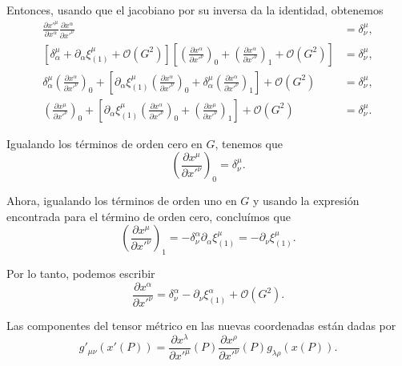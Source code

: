 \documentclass[letterpaper,11pt]{article}
\begin{document}
Entonces, usando que el jacobiano por su inversa da la identidad, obtenemos
\begin{align}
\frac{\partial x'^{\mu}}{\partial x^{\alpha}} \frac{\partial x^{\alpha}}{\partial x'^{\nu}} &= \delta^{\mu}_{\nu}, \\
\left[\delta^{\mu}_{\alpha} + \partial_{\alpha} \xi^{\mu}_{(1)} + \mathcal{O}(G^2)\right] \left[ \left(\frac{\partial x^{\alpha}}{\partial x'^{\nu}}\right)_0 + \left(\frac{\partial x^{\alpha}}{\partial x'^{\nu}}\right)_1 + \mathcal{O}(G^2) \right] &= \delta^{\mu}_{\nu}, \\
\delta^{\mu}_{\alpha} \left(\frac{\partial x^{\alpha}}{\partial x'^{\nu}}\right)_0 + \left[ \partial_{\alpha} \xi^{\mu}_{(1)}  \left(\frac{\partial x^{\alpha}}{\partial x'^{\nu}}\right)_0 + \delta_{\alpha}^{\mu}  \left(\frac{\partial x^{\alpha}}{\partial x'^{\nu}}\right)_1 \right] + \mathcal{O}(G^2)  &= \delta^{\mu}_{\nu}, \\
\left(\frac{\partial x^{\mu}}{\partial x'^{\nu}}\right)_0 + \left[  \partial_{\alpha} \xi^{\mu}_{(1)}  \left(\frac{\partial x^{\alpha}}{\partial x'^{\nu}}\right)_0 +  \left(\frac{\partial x^{\mu}}{\partial x'^{\nu}}\right)_1\right] + \mathcal{O}(G^2)  &= \delta^{\mu}_{\nu} .
\end{align}

Igualando los términos de orden cero en $G$, tenemos que
\begin{equation}
 \left(\frac{\partial x^{\mu}}{\partial x'^{\nu}}\right)_0  = \delta^{\mu}_{\nu}.
\end{equation}

Ahora, igualando los términos de orden uno en $G$ y usando la expresión encontrada para el término de orden cero, concluímos que
\begin{equation}
 \left(\frac{\partial x^{\mu}}{\partial x'^{\nu}}\right)_1 = - \delta^{\alpha}_{\nu} \partial_{\alpha} \xi^{\mu}_{(1)} = - \partial_{\nu} \xi^{\mu}_{(1)}.
\end{equation}

Por lo tanto, podemos escribir
\begin{equation}
\frac{\partial x^{\alpha}}{\partial x'^{\nu}} = \delta^{\alpha}_{\nu} - \partial_{\nu} \xi_{(1)}^{\alpha} + \mathcal{O}(G^2).\label{eq:gauge-4}
\end{equation}

Las componentes del tensor métrico en las nuevas coordenadas están dadas por
\begin{equation}
g'_{\mu\nu}(x'(P)) = \frac{\partial x^{\lambda}}{\partial x'^{\mu}}(P)\frac{\partial x^{\rho}}{\partial x'^{\nu}}(P) g_{\lambda\rho}(x(P)).
\end{equation}
\end{document}

